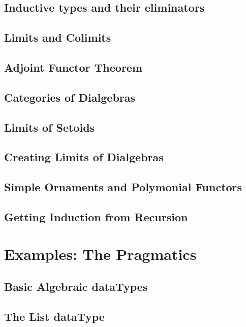 \documentclass[11pt,oneside]{article}
\begin{document}
\subsection{Inductive types and their eliminators}

\subsection{Limits and Colimits}

\subsection{Adjoint Functor Theorem}

\subsection{Categories of Dialgebras}

\subsection{Limits of Setoids}

\subsection{Creating Limits of Dialgebras}

\subsection{Simple Ornaments and Polymonial Functors}

\subsection{Getting Induction from Recursion}



\section{Examples: The Pragmatics}
\subsection{Basic Algebraic dataTypes}
\subsection{The List dataType}
\end{document}
